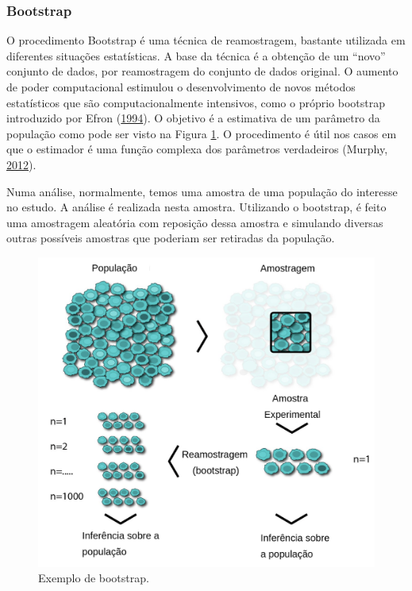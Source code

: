\documentclass[
	12pt,				%
	a4paper,		%
	oneside,    %
	chapter=TITLE,		   %
	section=TITLE,		   %
	subsection=TITLE,	   %
	subsubsection=TITLE, %
	english,			%
	french,				%
	spanish,			%
	brazil,				%
]{abntex2}
\begin{document}
\hypertarget{bootstrap}{%
\subsubsection{Bootstrap}\label{bootstrap}}

O procedimento Bootstrap é uma técnica de reamostragem, bastante
utilizada em diferentes situações estatísticas. A base da técnica é a
obtenção de um ``novo'' conjunto de dados, por reamostragem do conjunto
de dados original. O aumento de poder computacional estimulou o
desenvolvimento de novos métodos estatísticos que são computacionalmente
intensivos, como o próprio bootstrap introduzido por Efron
(\protect\hyperlink{ref-efron1994introduction}{1994}). O objetivo é a
estimativa de um parâmetro da população como pode ser visto na Figura
\ref{fig:bootstrap}. O procedimento é útil nos casos em que o estimador
é uma função complexa dos parâmetros verdadeiros (Murphy,
\protect\hyperlink{ref-murphy2012probabilistic}{2012}).

Numa análise, normalmente, temos uma amostra de uma população do
interesse no estudo. A análise é realizada nesta amostra. Utilizando o
bootstrap, é feito uma amostragem aleatória com reposição dessa amostra
e simulando diversas outras possíveis amostras que poderiam ser
retiradas da população.

\begin{figure}
\centering
\includegraphics[width=\textwidth,height=0.4\textheight]{../fig/bootstrap_traduzido.png}
\caption{Exemplo de bootstrap.\label{fig:bootstrap}}
\end{figure}
\end{document}
